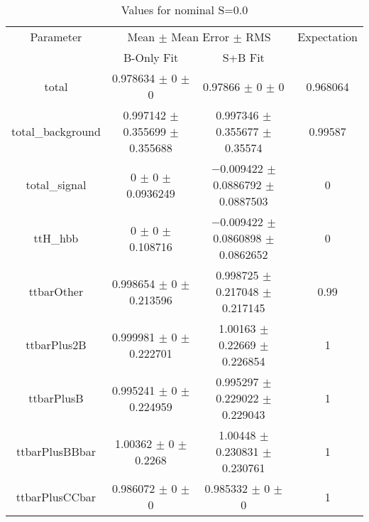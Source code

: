 \begin{table}
\centering
\caption{Values for nominal S=0.0}
\begin{tabular}{cccc}
\toprule
Parameter & \multicolumn{2}{c}{Mean $\pm$ Mean Error $\pm$ RMS} & Expectation\\
 & B-Only Fit & S+B Fit & \\
\midrule
total & \num{0.978634} $\pm$ \num{0} $\pm$ \num{0} & \num{0.97866} $\pm$ \num{0} $\pm$ \num{0} & \num{0.968064}\\
total\_background & \num{0.997142} $\pm$ \num{0.355699} $\pm$ \num{0.355688} & \num{0.997346} $\pm$ \num{0.355677} $\pm$ \num{0.35574} & \num{0.99587}\\
total\_signal & \num{0} $\pm$ \num{0} $\pm$ \num{0.0936249} & \num{-0.009422} $\pm$ \num{0.0886792} $\pm$ \num{0.0887503} & \num{0}\\
ttH\_hbb & \num{0} $\pm$ \num{0} $\pm$ \num{0.108716} & \num{-0.009422} $\pm$ \num{0.0860898} $\pm$ \num{0.0862652} & \num{0}\\
ttbarOther & \num{0.998654} $\pm$ \num{0} $\pm$ \num{0.213596} & \num{0.998725} $\pm$ \num{0.217048} $\pm$ \num{0.217145} & \num{0.99}\\
ttbarPlus2B & \num{0.999981} $\pm$ \num{0} $\pm$ \num{0.222701} & \num{1.00163} $\pm$ \num{0.22669} $\pm$ \num{0.226854} & \num{1}\\
ttbarPlusB & \num{0.995241} $\pm$ \num{0} $\pm$ \num{0.224959} & \num{0.995297} $\pm$ \num{0.229022} $\pm$ \num{0.229043} & \num{1}\\
ttbarPlusBBbar & \num{1.00362} $\pm$ \num{0} $\pm$ \num{0.2268} & \num{1.00448} $\pm$ \num{0.230831} $\pm$ \num{0.230761} & \num{1}\\
ttbarPlusCCbar & \num{0.986072} $\pm$ \num{0} $\pm$ \num{0} & \num{0.985332} $\pm$ \num{0} $\pm$ \num{0} & \num{1}\\
\bottomrule
\end{tabular}
\end{table}